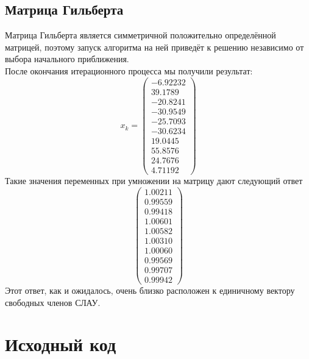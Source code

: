 \documentclass[../../report.tex]{subfiles}
\begin{document}
\subsection{Матрица Гильберта}
Матрица Гильберта является симметричной положительно определённой 
матрицей, поэтому запуск алгоритма на ней приведёт к решению 
независимо от выбора начального приближения. \\
После окончания итерационного процесса мы получили результат:
\[
x_k = 
\begin{pmatrix} 
 -6.92232 \\
  39.1789 \\
 -20.8241 \\
 -30.9549 \\
 -25.7093 \\
 -30.6234 \\
  19.0445 \\
  55.8576 \\
  24.7676 \\
  4.71192
\end{pmatrix}
\]
Такие значения переменных при умножении на матрицу дают следующий ответ
\[
\begin{pmatrix}
  1.00211 \\
  0.99559 \\
  0.99418 \\
  1.00601 \\
  1.00582 \\
  1.00310 \\
  1.00060 \\
  0.99569 \\
  0.99707 \\
  0.99942
\end{pmatrix}
\]
Этот ответ, как и ожидалось, очень близко расположен к единичному вектору свободных членов СЛАУ.

\section{Исходный код}
\end{document}
